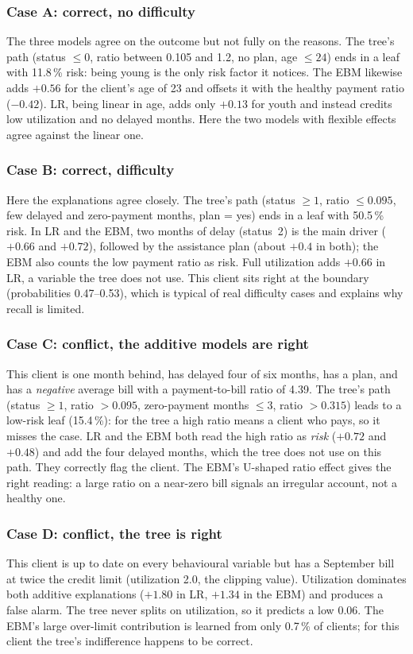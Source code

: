 \documentclass[a4paper,11pt]{article}
\begin{document}
\subsubsection{Case A: correct, no difficulty}
The three models agree on the outcome but not fully on the reasons. The tree's path (status $\leq 0$, ratio between 0.105 and 1.2, no plan, age $\leq 24$) ends in a leaf with 11.8\,\% risk: being young is the only risk factor it notices. The EBM likewise adds $+0.56$ for the client's age of 23 and offsets it with the healthy payment ratio ($-0.42$). LR, being linear in age, adds only $+0.13$ for youth and instead credits low utilization and no delayed months. Here the two models with flexible effects agree against the linear one.

\subsubsection{Case B: correct, difficulty}
Here the explanations agree closely. The tree's path (status $\geq 1$, ratio $\leq 0.095$, few delayed and zero-payment months, plan = yes) ends in a leaf with 50.5\,\% risk. In LR and the EBM, two months of delay (status~2) is the main driver ($+0.66$ and $+0.72$), followed by the assistance plan (about $+0.4$ in both); the EBM also counts the low payment ratio as risk. Full utilization adds $+0.66$ in LR, a variable the tree does not use. This client sits right at the boundary (probabilities 0.47--0.53), which is typical of real difficulty cases and explains why recall is limited.

\subsubsection{Case C: conflict, the additive models are right}
This client is one month behind, has delayed four of six months, has a plan, and has a \emph{negative} average bill with a payment-to-bill ratio of 4.39. The tree's path (status $\geq 1$, ratio $> 0.095$, zero-payment months $\leq 3$, ratio $> 0.315$) leads to a low-risk leaf (15.4\,\%): for the tree a high ratio means a client who pays, so it misses the case. LR and the EBM both read the high ratio as \emph{risk} ($+0.72$ and $+0.48$) and add the four delayed months, which the tree does not use on this path. They correctly flag the client. The EBM's U-shaped ratio effect gives the right reading: a large ratio on a near-zero bill signals an irregular account, not a healthy one.

\subsubsection{Case D: conflict, the tree is right}
This client is up to date on every behavioural variable but has a September bill at twice the credit limit (utilization 2.0, the clipping value). Utilization dominates both additive explanations ($+1.80$ in LR, $+1.34$ in the EBM) and produces a false alarm. The tree never splits on utilization, so it predicts a low 0.06. The EBM's large over-limit contribution is learned from only 0.7\,\% of clients; for this client the tree's indifference happens to be correct.
\end{document}
